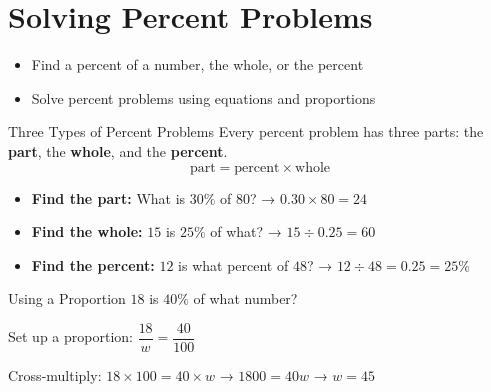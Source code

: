 \section{Solving Percent Problems}

\begin{learningGoals}
\begin{itemize}
    \item Find a percent of a number, the whole, or the percent
    \item Solve percent problems using equations and proportions
\end{itemize}
\end{learningGoals}

\begin{conceptBox}{Three Types of Percent Problems}
Every percent problem has three parts: the \textbf{part}, the \textbf{whole}, and the \textbf{percent}.
$$\text{part} = \text{percent} \times \text{whole}$$
\begin{itemize}[leftmargin=*]
    \item \textbf{Find the part:} What is $30\%$ of $80$? → $0.30 \times 80 = 24$
    \item \textbf{Find the whole:} $15$ is $25\%$ of what? → $15 \div 0.25 = 60$
    \item \textbf{Find the percent:} $12$ is what percent of $48$? → $12 \div 48 = 0.25 = 25\%$
\end{itemize}
\end{conceptBox}

\begin{workedExample}{Using a Proportion}
$18$ is $40\%$ of what number?

Set up a proportion: $\dfrac{18}{w} = \dfrac{40}{100}$

Cross-multiply: $18 \times 100 = 40 \times w$ → $1800 = 40w$ → $w = 45$
\end{workedExample}


